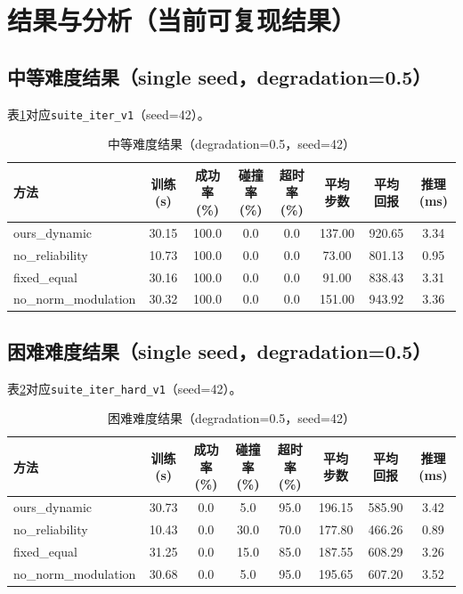 \section{结果与分析（当前可复现结果）}
\subsection{中等难度结果（single seed，degradation=0.5）}
表\ref{tab-main-results-easy}对应\texttt{suite\_iter\_v1}（seed=42）。

\begin{table}[h!]
    \centering
    \caption{中等难度结果（degradation=0.5，seed=42）}
    \label{tab-main-results-easy}
    \begin{tabular}{lccccccc}
        \toprule
        方法 & 训练(s) & 成功率(\%) & 碰撞率(\%) & 超时率(\%) & 平均步数 & 平均回报 & 推理(ms) \\
        \midrule
        ours\_dynamic & 30.15 & 100.0 & 0.0 & 0.0 & 137.00 & 920.65 & 3.34 \\
        no\_reliability & 10.73 & 100.0 & 0.0 & 0.0 & 73.00 & 801.13 & 0.95 \\
        fixed\_equal & 30.16 & 100.0 & 0.0 & 0.0 & 91.00 & 838.43 & 3.31 \\
        no\_norm\_modulation & 30.32 & 100.0 & 0.0 & 0.0 & 151.00 & 943.92 & 3.36 \\
        \bottomrule
    \end{tabular}
\end{table}

\subsection{困难难度结果（single seed，degradation=0.5）}
表\ref{tab-main-results-hard}对应\texttt{suite\_iter\_hard\_v1}（seed=42）。

\begin{table}[h!]
    \centering
    \caption{困难难度结果（degradation=0.5，seed=42）}
    \label{tab-main-results-hard}
    \begin{tabular}{lccccccc}
        \toprule
        方法 & 训练(s) & 成功率(\%) & 碰撞率(\%) & 超时率(\%) & 平均步数 & 平均回报 & 推理(ms) \\
        \midrule
        ours\_dynamic & 30.73 & 0.0 & 5.0 & 95.0 & 196.15 & 585.90 & 3.42 \\
        no\_reliability & 10.43 & 0.0 & 30.0 & 70.0 & 177.80 & 466.26 & 0.89 \\
        fixed\_equal & 31.25 & 0.0 & 15.0 & 85.0 & 187.55 & 608.29 & 3.26 \\
        no\_norm\_modulation & 30.68 & 0.0 & 5.0 & 95.0 & 195.65 & 607.20 & 3.52 \\
        \bottomrule
    \end{tabular}
\end{table}

